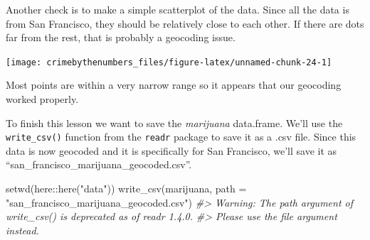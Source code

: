 \documentclass[
  12pt,
]{book}
\newenvironment{Shaded}{\begin{snugshade}}{\end{snugshade}}
\newcommand{\AttributeTok}[1]{\textcolor[rgb]{0.61,0.61,0.61}{#1}}
\newcommand{\CommentTok}[1]{\textcolor[rgb]{0.37,0.37,0.37}{\textit{#1}}}
\newcommand{\FunctionTok}[1]{\textcolor[rgb]{0,0,0}{#1}}
\newcommand{\NormalTok}[1]{#1}
\newcommand{\SpecialCharTok}[1]{\textcolor[rgb]{0,0,0}{#1}}
\newcommand{\StringTok}[1]{\textcolor[rgb]{0.5,0.5,0.5}{#1}}
\begin{document}
\begin{Shaded}
\end{Shaded}

Another check is to make a simple scatterplot of the data. Since all the data is from San Francisco, they should be relatively close to each other. If there are dots far from the rest, that is probably a geocoding issue.

\begin{Shaded}
\end{Shaded}

\begin{center}\texttt{[image: crimebythenumbers\_files/figure-latex/unnamed-chunk-24-1]} \end{center}

Most points are within a very narrow range so it appears that our geocoding worked properly.

To finish this lesson we want to save the \emph{marijuana} data.frame. We'll use the \texttt{write\_csv()} function from the \texttt{readr} package to save it as a .csv file. Since this data is now geocoded and it is specifically for San Francisco, we'll save it as ``san\_francisco\_marijuana\_geocoded.csv''.

\begin{Shaded}
\begin{Highlighting}[]
\FunctionTok{setwd}\NormalTok{(here}\SpecialCharTok{::}\FunctionTok{here}\NormalTok{(}\StringTok{"data"}\NormalTok{))}
\FunctionTok{write\_csv}\NormalTok{(marijuana, }\AttributeTok{path =} \StringTok{"san\_francisco\_marijuana\_geocoded.csv"}\NormalTok{)}
\CommentTok{\#\textgreater{} Warning: The \textasciigrave{}path\textasciigrave{} argument of \textasciigrave{}write\_csv()\textasciigrave{} is deprecated as of readr 1.4.0.}
\CommentTok{\#\textgreater{} Please use the \textasciigrave{}file\textasciigrave{} argument instead.}
\end{Highlighting}
\end{Shaded}
\end{document}
